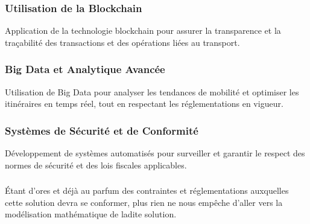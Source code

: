 \subsubsection*{Utilisation de la Blockchain}
Application de la technologie blockchain pour assurer la transparence et la traçabilité des transactions et des opérations liées au transport.

\subsubsection*{Big Data et Analytique Avancée}
Utilisation de Big Data pour analyser les tendances de mobilité et optimiser les itinéraires en temps réel, tout en respectant les réglementations en vigueur.

\subsubsection*{Systèmes de Sécurité et de Conformité}
Développement de systèmes automatisés pour surveiller et garantir le respect des normes de sécurité et des lois fiscales applicables.

\subsubsection*{}
Étant d'ores et déjà au parfum des contraintes et réglementations auxquelles cette solution devra se conformer, plus rien ne nous empêche d'aller vers la modélisation mathématique de ladite solution.




